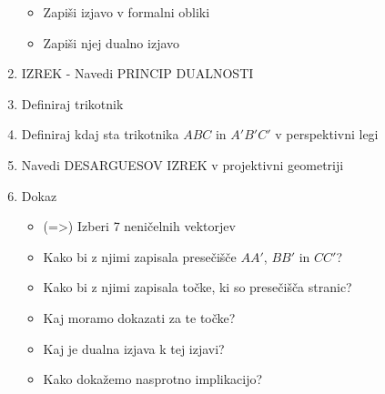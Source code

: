 \documentclass{article}
\begin{document}
\begin{enumerate}
        \begin{itemize}
            \item Zapiši izjavo v formalni obliki
            \item Zapiši njej dualno izjavo
        \end{itemize}
        \item IZREK - Navedi PRINCIP DUALNOSTI
        \item Definiraj trikotnik
        \item Definiraj kdaj sta trikotnika $ABC$ in $A'B'C'$ v perspektivni legi
        \item Navedi DESARGUESOV IZREK v projektivni geometriji
        \item Dokaz
        \begin{itemize}
            \item (=>) Izberi 7 neničelnih vektorjev
            \item Kako bi z njimi zapisala presečišče $AA'$, $BB'$ in $CC'$?
            \item Kako bi z njimi zapisala točke, ki so presečišča stranic?
            \item Kaj moramo dokazati za te točke?
            \item Kaj je dualna izjava k tej izjavi?
            \item Kako dokažemo nasprotno implikacijo? 
        \end{itemize} 
    \end{enumerate}
\end{document}
